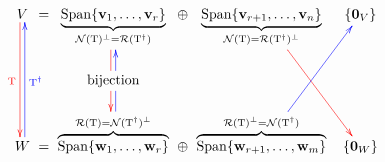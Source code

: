 \documentclass[11pt]{standalone}
\def\rT{\mathrm T}
\def\cN{\mathcal N}
\def\cR{\mathcal R}
\def\Span{\operatorname{Span}}
\def\V#1{\mathbf{#1}}
\def\vv{\V{v}}
\def\vw{\V{w}}
\def\lst#1#2{{#1}_1,\ldots,{#1}_{#2}}
\def\vect#1#2{\lst{\V{#1}}{#2}}
\begin{document}
$
\xymatrix @C0pt @R23pt{
	V \ar@<-0.4ex>@[red][dd]_{\textcolor{red}{\rT}}
		& = 
		& \underbrace{\Span\{\vect vr\}}_{\cN(\rT)^\perp=\cR(\rT^\dag)} \ar@<-0.4ex>@[red]@{-}[d]
		& \oplus
		& \underbrace{\Span\{\vv_{r+1},\ldots,\vv_n\}}_{\cN(\rT)=\cR(\rT^\dag)^\perp} \ar@[red][ddrr]
		&& \{\V0_V\} 
		\\
&&\text{bijection} \ar@<-0.4ex>@[blue][u] \ar@<-0.4ex>@[red][d]&&&\\
	W \ar@<-0.4ex>@[blue][uu]_{\textcolor{blue}{\rT^\dag}}
		& =
		& \overbrace{\Span\{\vect wr\}}^{\cR(\rT)=\cN(\rT^\dag)^\perp} \ar@<-0.4ex>@[blue]@{-}[u]
		& \oplus
		& \overbrace{\Span\{\vw_{r+1},\ldots,\vw_m\}}^{\cR(\rT)^\perp=\cN(\rT^\dag)} \ar@[blue][uurr]
		&& \{\V0_W\}
	}
$
\end{document}
